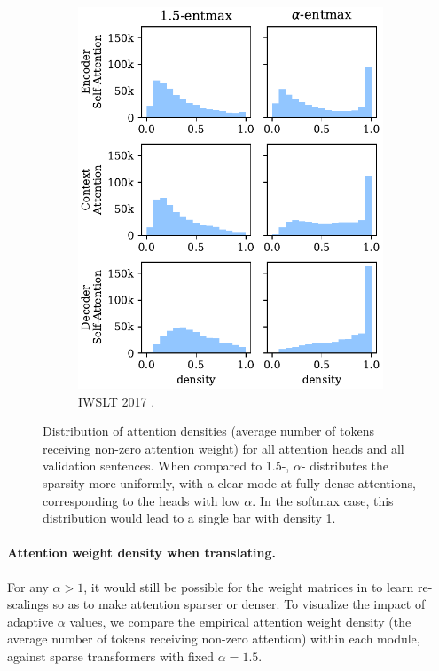 \begin{figure}[!htbp]
\begin{subfigure}[b]{.48\linewidth}
        \includegraphics[width=\linewidth]{Figures/hist_densities_de.pdf}
        \caption{%
            \label{fig:hist_densities_de}%
            IWSLT 2017 .}
    \end{subfigure}
    \caption[Distribution of attention densities for all attention heads.]{%
        \label{fig:hist_densities}
        Distribution of attention densities (average number of tokens
        receiving non-zero attention weight) for all attention heads and all
        validation sentences.
        When compared to 1.5-\entmaxtext{}, $\alpha$-\entmaxtext{}
        distributes the sparsity more uniformly, with a clear mode
        at fully dense attentions, corresponding to the heads with low
        $\alpha$. In the softmax case, this distribution would lead to a
        single bar with density 1.}
\end{figure}

\paragraph*{Attention weight density when translating.}
For any $\alpha>1$, it would still be possible for the weight
matrices in  to learn re-scalings so as to make
attention sparser or denser. To visualize the impact of adaptive
$\alpha$ values, we compare the empirical attention weight density
(the average number of tokens receiving non-zero attention) within
each module, against sparse transformers with fixed $\alpha=1.5$.


